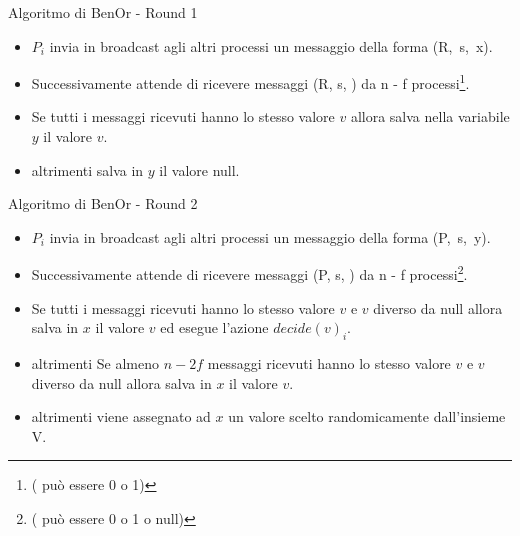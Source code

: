 \documentclass{beamer}
\begin{document}
\begin{frame}{Algoritmo di BenOr - Round 1}
    \begin{itemize}
        \item $P_{i}$ invia in broadcast agli altri processi un messaggio della forma \mbox{(R, s, x)}. 
        
        \item Successivamente attende di ricevere messaggi (R, s, ) da n - f processi\footnote{( può essere 0 o 1)}.
        
        \item Se tutti i messaggi ricevuti hanno lo stesso valore $v$ allora salva nella variabile $y$ il valore $v$.
            
        \item altrimenti salva in $y$ il valore null.
    
    \end{itemize}
\end{frame}


\begin{frame}{Algoritmo di BenOr - Round 2}

    \begin{itemize}
        \item $P_{i}$ invia in broadcast agli altri processi un messaggio della forma \mbox{(P, s, y)}.
    
        \item Successivamente attende di ricevere messaggi (P, s, ) da n - f processi\footnote{( può essere 0 o 1 o null)}.
        
        \item Se tutti i messaggi ricevuti hanno lo stesso valore $v$ e $v$ diverso da null allora salva in $x$ il valore $v$ ed esegue l'azione $decide(v)_{i}$.
        
        \item altrimenti Se almeno $n - 2f$ messaggi ricevuti hanno lo stesso valore $v$ e $v$ diverso da null allora salva in $x$ il valore $v$.
        
        \item altrimenti viene assegnato ad $x$ un valore scelto randomicamente dall'insieme V.
    \end{itemize}
\end{frame}


\end{document}

